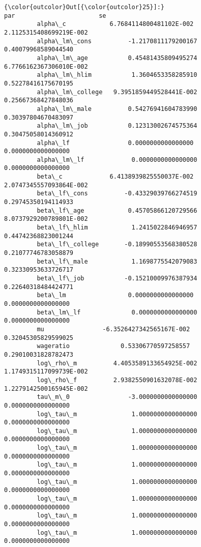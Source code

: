 \documentclass[11pt]{article}
\begin{document}
\begin{Verbatim}[commandchars=\\\{\}]
{\color{outcolor}Out[{\color{outcolor}25}]:}                                        par                       se
         alpha\_c            6.7684114800481102E-002  2.1125315408699219E-002
         alpha\_lm\_cons          -1.2170811179200167      0.40079968589044540
         alpha\_lm\_age           0.45481435809495274  6.7766162367306010E-002
         alpha\_lm\_hlim           1.3604653358285910      0.52278416175670195
         alpha\_lm\_college   9.3951859449528441E-002      0.25667368427848036
         alpha\_lm\_male          0.54276941604783990      0.30397804670483097
         alpha\_lm\_job           0.12313002674575364      0.30475058014360912
         alpha\_lf                0.0000000000000000       0.0000000000000000
         alpha\_lm\_lf             0.0000000000000000       0.0000000000000000
         beta\_c             6.4138939825550037E-002  2.0747345557093864E-002
         beta\_lf\_cons          -0.43329039766274519      0.29745350194114933
         beta\_lf\_age            0.45705866120729566  8.0737929200789801E-002
         beta\_lf\_hlim            1.2415022846946957      0.44742368823001244
         beta\_lf\_college       -0.18990553568380528      0.21077746783058879
         beta\_lf\_male            1.1698775542079083      0.32330953633726717
         beta\_lf\_job           -0.15210009976387934      0.22640318484424771
         beta\_lm                 0.0000000000000000       0.0000000000000000
         beta\_lm\_lf              0.0000000000000000       0.0000000000000000
         mu                -6.3526427342565167E-002      0.32045305829599025
         wageratio              0.53306770597258557      0.29010031828782473
         log\_rho\_m          4.4053589133654925E-002  1.1749315117099739E-002
         log\_rho\_f          2.9382550901632078E-002  1.2279142500165945E-002
         tau\_m\_0                -3.0000000000000000       0.0000000000000000
         log\_tau\_m               1.0000000000000000       0.0000000000000000
         log\_tau\_m               1.0000000000000000       0.0000000000000000
         log\_tau\_m               1.0000000000000000       0.0000000000000000
         log\_tau\_m               1.0000000000000000       0.0000000000000000
         log\_tau\_m               1.0000000000000000       0.0000000000000000
         log\_tau\_m               1.0000000000000000       0.0000000000000000
         log\_tau\_m               1.0000000000000000       0.0000000000000000
         log\_tau\_m               1.0000000000000000       0.0000000000000000

\end{Verbatim}
\end{document}
